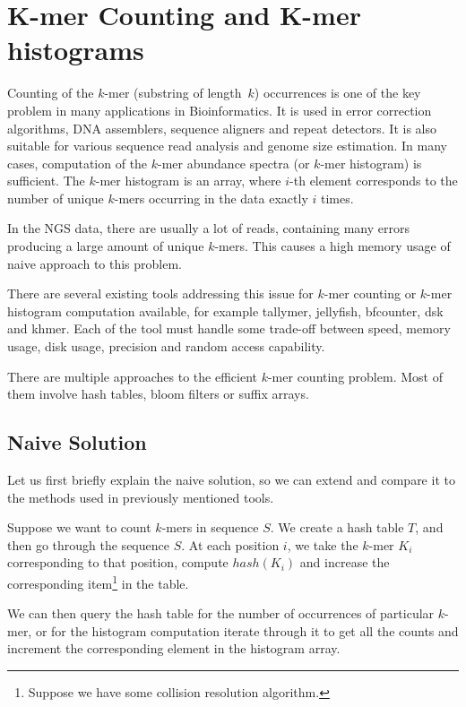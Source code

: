 \chapter{K-mer Counting and K-mer histograms}


Counting of the $k$-mer (substring of length~$k$) occurrences is one of the key problem in many applications in Bioinformatics.
It is used in error correction algorithms, DNA assemblers, sequence aligners and repeat detectors. It is also suitable for various sequence read analysis and genome size estimation. In many cases, computation of the $k$-mer abundance spectra (or $k$-mer histogram) is sufficient. The $k$-mer histogram is an array, where $i$-th element corresponds to the number of unique $k$-mers occurring in the data exactly $i$ times.

In the NGS data, there are usually a lot of reads, containing many errors producing a large amount of unique $k$-mers.
This causes a high memory usage of naive approach to this problem.

There are several existing tools addressing this issue for $k$-mer counting or $k$-mer histogram computation available, for example tallymer\cite{tallymer}, jellyfish\cite{jellyfish}, bfcounter\cite{bfcounter}, dsk\cite{dsk} and khmer\cite{khmer}. Each of the tool must handle some trade-off between speed, memory usage, disk usage, precision and random access capability.

There are multiple approaches to the efficient $k$-mer counting problem. Most of them involve hash tables, bloom filters or suffix arrays.

\section{Naive Solution}

Let us first briefly explain the naive solution, so we can extend and compare it to the methods used in previously mentioned tools.

Suppose we want to count $k$-mers in sequence $S$.
We create a hash table $T$, and then go through the sequence $S$.
At each position $i$, we take the $k$-mer $K_i$ corresponding to that  position, compute $hash(K_i)$ and increase the corresponding item\footnote{Suppose we have some collision resolution algorithm.} in the table.

We can then query the hash table for the number of occurrences of particular $k$-mer, or for the histogram computation iterate through it to get all the counts and increment the corresponding element in the histogram array.

